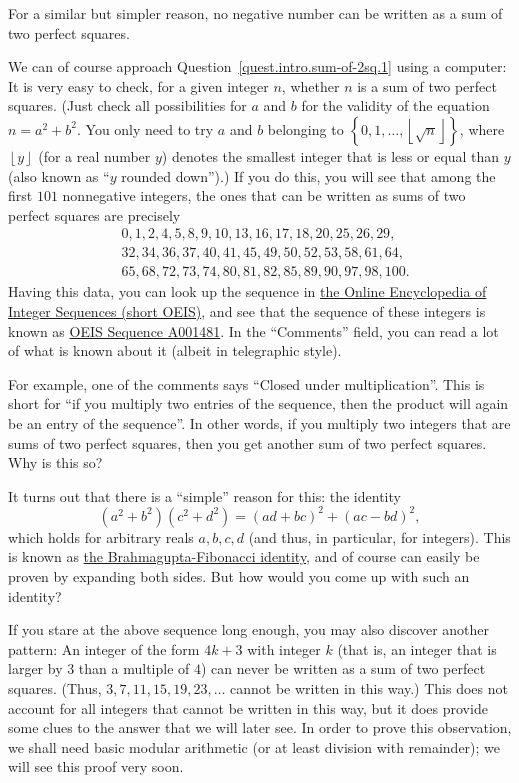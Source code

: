 \documentclass[numbers=enddot,12pt,final,onecolumn,notitlepage]{scrartcl}%
\numberwithin{exer}{section}
\theoremstyle{definition}
\begin{document}
For a similar but simpler reason, no negative number can be written as a sum
of two perfect squares.

We can of course approach Question~\ref{quest.intro.sum-of-2sq.1} using a
computer: It is very easy to check, for a given integer $n$, whether $n$ is a
sum of two perfect squares. (Just check all possibilities for $a$ and $b$ for
the validity of the equation $n = a^{2} + b^{2}$. You only need to try $a$ and
$b$ belonging to $\left\{  0, 1, \ldots, \left\lfloor \sqrt{n} \right\rfloor
\right\}  $, where $\left\lfloor y \right\rfloor $ (for a real number $y$)
denotes the smallest integer that is less or equal than $y$ (also known as
``$y$ rounded down'').) If you do this, you will see that among the first
$101$ nonnegative integers, the ones that can be written as sums of two
perfect squares are precisely
\begin{align*}
&  0, 1, 2, 4, 5, 8, 9, 10, 13, 16, 17, 18, 20, 25, 26, 29,\\
&  32, 34, 36, 37, 40, 41, 45, 49, 50, 52, 53, 58, 61, 64,\\
&  65, 68, 72, 73, 74, 80, 81, 82, 85, 89, 90, 97, 98, 100 .
\end{align*}
Having this data, you can look up the sequence in \href{https://oeis.org/}{the
Online Encyclopedia of Integer Sequences (short OEIS)}, and see that the
sequence of these integers is known as \href{https://oeis.org/A001481}{OEIS
Sequence A001481}. In the ``Comments'' field, you can read a lot of what is
known about it (albeit in telegraphic style).

For example, one of the comments says ``Closed under multiplication''. This is
short for ``if you multiply two entries of the sequence, then the product will
again be an entry of the sequence''. In other words, if you multiply two
integers that are sums of two perfect squares, then you get another sum of two
perfect squares. Why is this so?

It turns out that there is a ``simple'' reason for this: the identity
\[
\left(  a^{2}+b^{2}\right)  \left(  c^{2}+d^{2}\right)  =\left(  ad+bc\right)
^{2}+\left(  ac-bd\right)  ^{2} ,
\]
which holds for arbitrary reals $a,b,c,d$ (and thus, in particular, for
integers). This is known as
\href{https://en.wikipedia.org/wiki/Brahmagupta-Fibonacci_identity}{the
Brahmagupta-Fibonacci identity}, and of course can easily be proven by
expanding both sides. But how would you come up with such an identity?

If you stare at the above sequence long enough, you may also discover another
pattern: An integer of the form $4k+3$ with integer $k$ (that is, an integer
that is larger by $3$ than a multiple of $4$) can never be written as a sum of
two perfect squares. (Thus, $3, 7, 11, 15, 19, 23, \ldots$ cannot be written
in this way.) This does not account for all integers that cannot be written in
this way, but it does provide some clues to the answer that we will later see.
In order to prove this observation, we shall need basic modular arithmetic (or
at least division with remainder); we will see this proof very soon.
\end{document}
